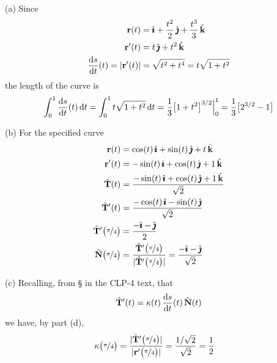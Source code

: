 \begin{solution} (a)
Since
\begin{align*}
\vr(t)&= \hi +\frac{t^2}{2}\,\hj + \frac{t^3}{3}\,\hk \\
\vr'(t)&= t\,\hj + t^2\,\hk \\
\diff{s}{t}(t)=|\vr'(t)|&=\sqrt{t^2+t^4}=t\sqrt{1+t^2}
\end{align*}
the length of the curve is
\begin{align*}
\int_0^1 \diff{s}{t}(t)\,\dee{t}
=\int_0^1 t\sqrt{1+t^2}\,\dee{t}
=\frac{1}{3}{\big[1+t^2\big]}^{3/2}\Big|_0^1
=\frac{1}{3}\big[2^{3/2}-1\big]
\end{align*}

(b) For the specified curve
\begin{align*}
\mathbf{r}(t) &= \cos(t)\,\hat{\pmb{\imath}} + \sin(t)\,\hat{\pmb{\jmath}}  + t\,\hat{\mathbf{k}} \\
\mathbf{r}'(t) &= -\sin(t)\,\hat{\pmb{\imath}} + \cos(t)\,\hat{\pmb{\jmath}}  + 1\,\hat{\mathbf{k}} \\
\hat{\mathbf{T}}(t) &=\frac{-\sin(t)\,\hat{\pmb{\imath}} + \cos(t)\,\hat{\pmb{\jmath}}  + 1\,\hat{\mathbf{k}}}{\sqrt{2}} \\
\hat{\mathbf{T}}'(t) &=\frac{-\cos(t)\,\hat{\pmb{\imath}} - \sin(t)\,\hat{\pmb{\jmath}}}{\sqrt{2}} \\
\hat{\mathbf{T}}'\big(\nicefrac{\pi}{4}\big) &=\frac{-\hat{\pmb{\imath}} - \hat{\pmb{\jmath}}}{2} \\
\hat{\mathbf{N}}\big(\nicefrac{\pi}{4}\big) 
&=\frac{\hat{\mathbf{T}}'\big(\nicefrac{\pi}{4}\big)}
       {|\hat{\mathbf{T}}'\big(\nicefrac{\pi}{4}\big)|}
=\frac{-\hat{\pmb{\imath}} - \hat{\pmb{\jmath}}}{\sqrt{2}} \\
\end{align*}

(c) Recalling, from \S{} in the CLP-4 text, 
that
\begin{align*}
\hat\vT'(t) 
=\ka(t) \,\diff{s}{t}(t)\,\hat\vN(t)
\end{align*}
we have, by part (d),
\begin{align*}
\kappa\big(\nicefrac{\pi}{4}\big)
&=\frac{|\hat{\mathbf{T}}'\big(\nicefrac{\pi}{4}\big)|}
       {|\mathbf{r}'\big(\nicefrac{\pi}{4}\big)|}
=\frac{1/\sqrt{2}}{\sqrt{2}}
=\frac{1}{2}
\end{align*}
\end{solution}

